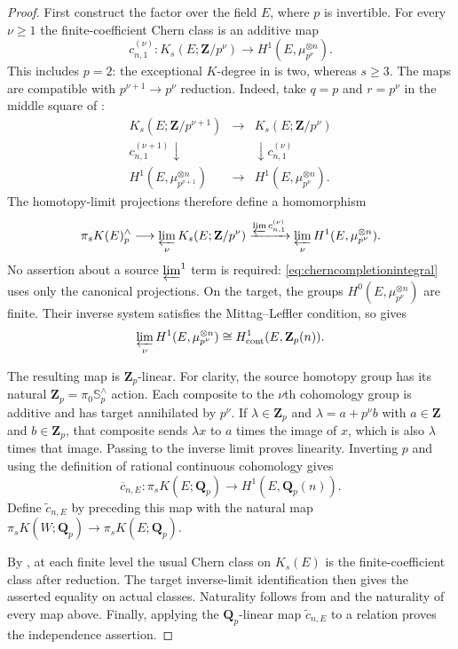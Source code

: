 \documentclass[11pt,a4paper]{article}
\theoremstyle{remark}
\newcommand{\Q}{\mathbf Q}
\newcommand{\Z}{\mathbf Z}
\begin{document}
\begin{proof}
First construct the factor over the field $E$, where $p$ is invertible.
For every $\nu\geq1$ the finite-coefficient Chern class is an
additive map
\[
 c^{(\nu)}_{n,1}:K_s(E;\Z/p^\nu)
       \longrightarrow H^1(E,\mu_{p^\nu}^{\otimes n}).
\]
This includes $p=2$: the exceptional $K$-degree in
\cite[Proposition~2.4, p.~10]{WeibelChern} is two, whereas $s\geq3$.
The maps are compatible with $p^{\nu+1}\to p^\nu$ reduction.
Indeed, take $q=p$ and $r=p^\nu$ in the middle square of
\cite[Proposition~2.8, p.~12]{WeibelChern}:
\[
\begin{array}{ccc}
 K_s(E;\Z/p^{\nu+1})&\longrightarrow&K_s(E;\Z/p^\nu)\\
 {\scriptstyle c^{(\nu+1)}_{n,1}}\downarrow&&
             \downarrow{\scriptstyle c^{(\nu)}_{n,1}}\\
 H^1(E,\mu_{p^{\nu+1}}^{\otimes n})&\longrightarrow&
                         H^1(E,\mu_{p^\nu}^{\otimes n}).
\end{array}
\]
The homotopy-limit projections therefore define a homomorphism
\begin{equation}\label{eq:cherncompletionintegral}
 \pi_sK(E)^{\wedge}_p
 \longrightarrow\varprojlim_{\nu} K_s(E;\Z/p^\nu)
 \xrightarrow{\varprojlim c^{(\nu)}_{n,1}}
 \varprojlim_{\nu}H^1(E,\mu_{p^\nu}^{\otimes n}).
\end{equation}
No assertion about a source $\varprojlim^{1}$ term is required:
\eqref{eq:cherncompletionintegral} uses only the canonical projections.
On the target, the groups $H^0(E,\mu_{p^\nu}^{\otimes n})$ are
finite. Their inverse system satisfies the Mittag--Leffler condition,
so \cite[equation~(0.2), p.~208]{Jannsen} gives
\[
 \varprojlim_{\nu}H^1(E,\mu_{p^\nu}^{\otimes n})
       \cong H^1_{\mathrm{cont}}(E,\Z_p(n)).
\]

The resulting map is $\Z_p$-linear. For clarity, the source homotopy
group has its natural $\Z_p=\pi_0\mathbb S^{\wedge}_p$ action.
Each composite to the $\nu$th cohomology group is additive and has
target annihilated by $p^\nu$. If $\lambda\in\Z_p$ and
$\lambda=a+p^\nu b$ with $a\in\Z$ and $b\in\Z_p$, that composite
sends $\lambda x$ to $a$ times the image of $x$, which is also
$\lambda$ times that image. Passing to the inverse limit proves
linearity. Inverting $p$ and using the definition of rational
continuous cohomology \cite[equation~(0.4)]{Jannsen} gives
\[
 \overline c_{n,E}:\pi_sK(E;\Q_p)
                 \longrightarrow H^1(E,\Q_p(n)).
\]
Define $\widetilde c_{n,E}$ by preceding this map with the natural
map $\pi_sK(W;\Q_p)\to\pi_sK(E;\Q_p)$.

By \cite[Lemma~2.3, p.~10]{WeibelChern}, at each finite level the
usual Chern class on $K_s(E)$ is the finite-coefficient class after
reduction. The target inverse-limit identification then gives the
asserted equality on actual classes. Naturality follows from
\cite[Proposition~2.1.1]{WeibelChern} and the naturality of every
map above. Finally, applying the $\Q_p$-linear map
$\widetilde c_{n,E}$ to a relation proves the independence assertion.
\end{proof}
\end{document}
